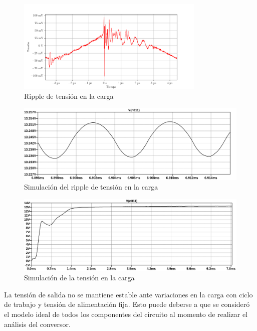 \begin{figure}[H]
    \centering
    \includegraphics[width=0.8\textwidth]{images/capturas-osciloscopio/17-11-2022/58.png}
    \caption{Ripple de tensión en la carga}
    \label{fig:osc:58}
\end{figure}

\begin{figure}[H]
    \centering
    \includegraphics[width=\textwidth]{images/sim/21-ripple.pdf}
    \caption{Simulación del ripple de tensión en la carga}
    \label{fig:sim:21ripple}
\end{figure}

\begin{figure}[H]
    \centering
    \includegraphics[width=\textwidth]{images/sim/21.pdf}
    \caption{Simulación de la tensión en la carga}
    \label{fig:sim:21}
\end{figure}

La tensión de salida no se mantiene estable ante variaciones en la carga con ciclo de trabajo y tensión de alimentación fija. 
Esto puede deberse a que se consideró el modelo ideal de todos los componentes del circuito al momento de realizar el análisis del conversor. 

